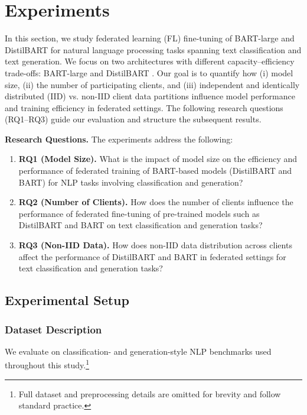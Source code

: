 \documentclass[conference]{IEEEtran}
\begin{document}


\section{Experiments}
\label{sec:experiments}

In this section, we study federated learning (FL) fine-tuning of BART-large and DistilBART for natural language processing tasks spanning text classification and text generation. We focus on two architectures with different capacity–efficiency trade-offs: BART-large and DistilBART \cite{lewis2020bart,shleifer2020distilbart}. Our goal is to quantify how (i) model size, (ii) the number of participating clients, and (iii) independent and identically distributed (IID) vs. non-IID client data partitions influence model performance and training efficiency in federated settings. The following research questions (RQ1–RQ3) guide our evaluation and structure the subsequent results.

\noindent\textbf{Research Questions.} The experiments address the following:
\begin{enumerate}
  \item \textbf{RQ1 (Model Size).} What is the impact of model size on the efficiency and performance of federated training of BART-based models (DistilBART and BART) for NLP tasks involving classification and generation?
  \item \textbf{RQ2 (Number of Clients).} How does the number of clients influence the performance of federated fine-tuning of pre-trained models such as DistilBART and BART on text classification and generation tasks?
  \item \textbf{RQ3 (Non-IID Data).} How does non-IID data distribution across clients affect the performance of DistilBART and BART in federated settings for text classification and generation tasks?
\end{enumerate}

\subsection{Experimental Setup}
\subsubsection{Dataset Description}
We evaluate on classification- and generation-style NLP benchmarks used throughout this study.\footnote{Full dataset and preprocessing details are omitted for brevity and follow standard practice.}
\end{document}
